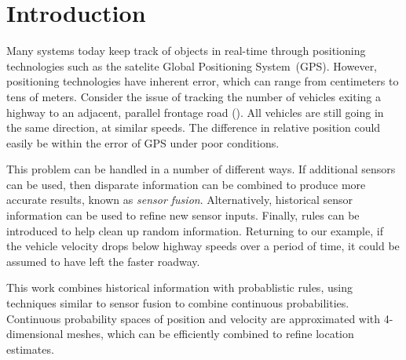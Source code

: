 \section{Introduction}

Many systems today keep track of objects in real-time through positioning technologies such as the satelite Global Positioning System~(GPS).
However, positioning technologies have inherent error, which can range from centimeters to tens of meters.
Consider the issue of tracking the number of vehicles exiting a highway to an adjacent, parallel frontage road (). All vehicles are still going in the same direction, at similar speeds. The difference in relative position could easily be within the error of GPS under poor conditions.

This problem can be handled in a number of different ways. If additional sensors can be used, then disparate information can be combined to produce more accurate results, known as \textit{sensor fusion}.
Alternatively, historical sensor information can be used to refine new sensor inputs.
Finally, rules can be introduced to help clean up random information. Returning to our example, if the vehicle velocity drops below highway speeds over a period of time, it could be assumed to have left the faster roadway.

This work combines historical information with probablistic rules, using techniques similar to sensor fusion to combine continuous probabilities. Continuous probability spaces of position and velocity are approximated with 4-dimensional meshes, which can be efficiently combined to refine location estimates.
